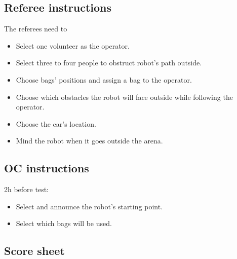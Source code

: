 \subsection*{Referee instructions}

The referees need to
\begin{itemize}[nosep]
	\item Select one volunteer as the operator.
	\item Select three to four people to obstruct robot's path outside.
	\item Choose bags' positions and assign a bag to the operator.
	\item Choose which obstacles the robot will face outside while following the operator.
	\item Choose the car's location.
	\item Mind the robot when it goes outside the arena.
\end{itemize}

\subsection*{OC instructions}

2h before test:
\begin{itemize}[nosep]
	\item Select and announce the robot's starting point.
	\item Select which bags will be used.
\end{itemize}

\subsection*{Score sheet}

